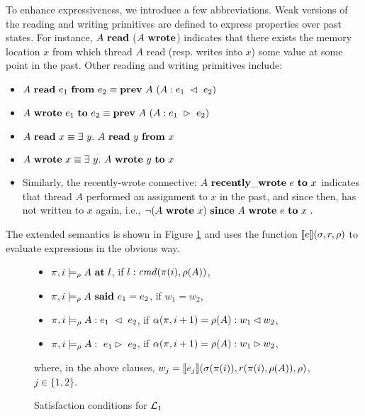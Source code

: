 To enhance expressiveness, we introduce a few abbreviations. Weak versions of the reading and writing primitives are defined to express properties over past states. For instance, $A\ \Reads$ ($A\ \mathbf{wrote}$) indicates that there exists the memory location $x$ from which thread $A$ read (resp. writes into $x$) some value at some point in the past. Other reading and writing primitives include:

\begin{itemize}
\item $A\ \mathbf{read}\ e_1\ \mathbf{from}\ e_2 \equiv \mathbf{prev}\ A\ (A:e_1\ \lhd\ e_2)$
\item $A\ \mathbf{wrote}\ e_1\ \mathbf{to}\ e_2 \equiv \mathbf{prev}\ A\ (A: e_1\ \rhd\ e_2)$
\item $A\ \Reads\ x \equiv \exists\ y.\ A\ \Reads\ y\ \From\ x$
\item $A\ \Writes\ x \equiv \exists\ y.\ A\ \Writes\ y\ \To\ x$
\item Similarly, 
the recently-wrote connective: 
$A\ \mathbf{recently\_wrote}\ e\ \mathbf{to}\ x$ 
indicates that thread $A$ performed an assignment to $x$ in the past, and since then, has not written to $x$ again, i.e., $\neg(A\ \Writes\ x)\ \Since\ A\ \Writes\ e\ \To\ x\ .$
\end{itemize}

The extended semantics is shown in Figure \ref{LLanOneSemantics} and uses the function $\mbox{$\llbracket$}{e}\mbox{$\rrbracket$}(\sigma ,r ,\rho)$ to evaluate expressions in
the obvious way.
%
\begin{figure}[t]
\begin{itemize}
\item $\pi,i\models_{\rho}A\ \At\ \Label$, if $l:\mathit{cmd}(\pi(i),\rho(A))$,
\item $\pi,i\models_\rho  A\ \mathbf{said}\ e_1 = e_2$, if $w_1 = w_2$,
\item $\pi,i\models_\rho A: e_1\ \ReadFrom\ e_2$, if
$\alpha(\pi,i+1) = \rho(A):w_1\lhd w_2$,
\item $\pi,i\models_\rho A :\ e_1\WriteTo \ e_2$, if 
$\alpha(\pi,i+1) = \rho(A):w_1\rhd w_2$,
\end{itemize}
where, in the above clauses, $w_j = \mbox{$\llbracket$}{e_j}\mbox{$\rrbracket$}(\sigma(\pi(i)),r(\pi(i),\rho(A)),\rho)$, $j\in\{1,2\}$.
\caption{Satisfaction conditions for $\mathcal{L}_1$}
\label{SatisfactionDef}
\label{LLanOneSemantics}
\end{figure}
 

